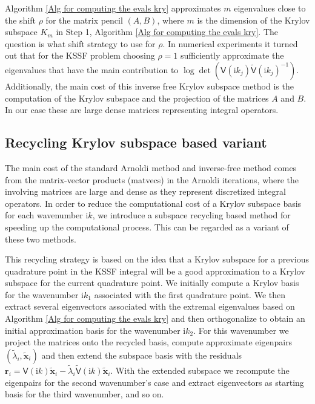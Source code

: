     
Algorithm \ref{Alg for computing the evals kry} approximates $m$ eigenvalues close to the shift $\rho$ 
for the matrix pencil $(A,B)$, where $m$ is the dimension of the 
Krylov subspace $K_{m}$ in Step 1, Algorithm \ref{Alg for computing the evals kry}. The question is what shift strategy to use for $\rho$. In numerical experiments it turned
out that for the KSSF problem choosing $\rho=1$ sufficiently approximate the eigenvalues that have the main contribution to $\log\det(\mathsf{V}(\mathrm{i}k_{j})\tilde{\mathsf{V}}(\mathrm{i}k_{j})^{-1}) $.
Additionally, the main cost of this inverse free Krylov subspace method is the computation of the Krylov subspace and the projection of the matrices $A$ and $B$. In our case these are large dense matrices representing
integral operators. 

\subsection{Recycling Krylov subspace based variant}

The main cost of the standard Arnoldi method and inverse-free method comes from the matrix-vector products (matvecs) in the Arnoldi iterations, where the 
involving matrices are large and dense as they represent discretized integral operators. In order to reduce the computational cost of a Krylov subspace basis 
for each wavenumber $\mathrm{i}k$, we introduce a subspace recycling based method for speeding up the computational process. This can be regarded 
as a variant of these two methods.

This recycling strategy is based on the idea that a Krylov subspace for a previous quadrature
point in the KSSF integral will be a good approximation to a Krylov subspace for the current quadrature point. We initially compute a Krylov basis for the wavenumber $\mathrm{i}k_{1}$ associated with the first
quadrature point. We then extract several eigenvectors associated with the extremal eigenvalues based on Algorithm \ref{Alg for computing the evals kry} and then orthogonalize to obtain an initial approximation
basis for the wavenumber $\mathrm{i}k_2$. For this wavenumber we project the matrices onto the recycled basis, compute approximate eigenpairs $(\tilde{\lambda}_i, \tilde{\mathbf{x}}_i)$ and then extend the subspace
basis with the residuals $\boldsymbol{r}_i = \mathsf{V}(\mathrm{i}k)\tilde{\boldsymbol{x}}_i - \tilde{\lambda}_i\tilde{\mathsf{V}}(\mathrm{i}k)\tilde{\boldsymbol{x}}_i$. With the extended subspace we recompute the eigenpairs for the second wavenumber's
case and extract eigenvectors as starting basis for the third wavenumber, and so on.

